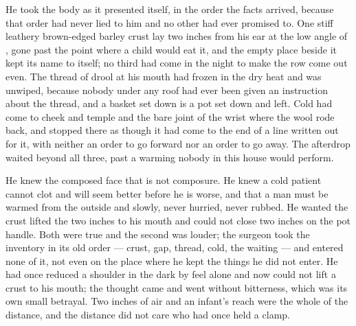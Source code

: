 He took the body as it presented itself, in the order the facts arrived, because that order had never lied to him and no other had ever promised to. One stiff leathery brown-edged barley crust lay two inches from his ear at the low angle of , gone past the point where a child would eat it, and the empty place beside it kept its name to itself; no third had come in the night to make the row come out even. The thread of drool at his mouth had frozen in the dry heat and was unwiped, because nobody under any roof had ever been given an instruction about the thread, and a basket set down is a pot set down and left. Cold had come to cheek and temple and the bare joint of the wrist where the wool rode back, and stopped there as though it had come to the end of a line written out for it, with neither an order to go forward nor an order to go away. The afterdrop waited beyond all three, past a warming nobody in this house would perform.

He knew the composed face that is not composure. He knew a cold patient cannot clot and will seem better before he is worse, and that a man must be warmed from the outside and slowly, never hurried, never rubbed. He wanted the crust lifted the two inches to his mouth and could not close two inches on the pot handle. Both were true and the second was louder; the surgeon took the inventory in its old order --- crust, gap, thread, cold, the waiting --- and entered none of it, not even on the place where he kept the things he did not enter. He had once reduced a shoulder in the dark by feel alone and now could not lift a crust to his mouth; the thought came and went without bitterness, which was its own small betrayal. Two inches of air and an infant's reach were the whole of the distance, and the distance did not care who had once held a clamp.

\scenebreak

